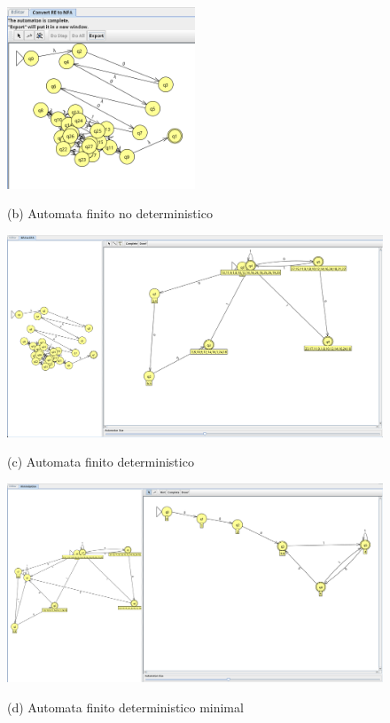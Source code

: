 \documentclass{article}
\begin{document}
        \begin{figure}[!h]
            \centering
            \includegraphics[width=0.5\textwidth]{./Imagenes/image21.png}
            \label{fig:label4}
            \caption*{(b) Automata finito no deterministico}
        \end{figure}

        \newpage

        \begin{figure}[!h]
            \centering
            \includegraphics[width=1.2\textwidth]{./Imagenes/image22.png}
            \label{fig:label4}
            \caption*{(c) Automata finito  deterministico}
        \end{figure}

        \begin{figure}[!h]
            \centering
            \includegraphics[width=1.2\textwidth]{./Imagenes/image23.png}
            \label{fig:label4}
            \caption*{(d) Automata finito deterministico minimal}
        \end{figure}
\end{document}

